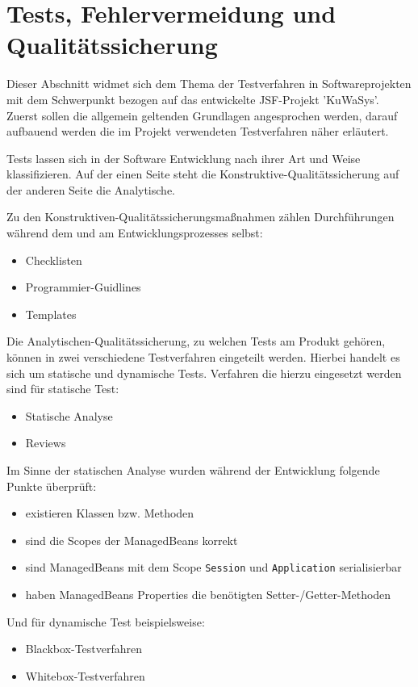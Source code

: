 \documentclass[12pt, twoside, a4paper, ngerman]{article}
\begin{document}
\section{Tests, Fehlervermeidung und Qualitätssicherung}\label{sec:Testing und Debugging}

Dieser Abschnitt widmet sich dem Thema der Testverfahren in Softwareprojekten mit dem Schwerpunkt bezogen auf das entwickelte JSF-Projekt 'KuWaSys'.
Zuerst sollen die allgemein geltenden Grundlagen angesprochen werden, darauf aufbauend werden die im Projekt verwendeten Testverfahren näher erläutert. 

Tests lassen sich in der Software Entwicklung nach ihrer Art und Weise klassifizieren.
Auf der einen Seite steht die Konstruktive-Qualitätssicherung auf der anderen Seite die Analytische.

Zu den Konstruktiven-Qualitätssicherungsmaßnahmen zählen Durchführungen während dem und am Entwicklungsprozesses selbst:
\begin{itemize}
  \item Checklisten
  \item Programmier-Guidlines
  \item Templates
\end{itemize}

Die Analytischen-Qualitätssicherung, zu welchen Tests am Produkt gehören, können in zwei verschiedene Testverfahren eingeteilt werden. Hierbei handelt es sich um statische und dynamische Tests.
Verfahren die hierzu eingesetzt werden sind für statische Test:
\begin{itemize}
  \item Statische Analyse
  \item Reviews
\end{itemize}

Im Sinne der statischen Analyse wurden während der Entwicklung folgende Punkte überprüft:
\begin{itemize}
  \item existieren Klassen bzw. Methoden
  \item sind die Scopes der ManagedBeans korrekt
  \item sind ManagedBeans mit dem Scope \texttt{Session} und \texttt{Application} serialisierbar
  \item haben ManagedBeans Properties die benötigten Setter-/Getter-Methoden
\end{itemize}

Und für dynamische Test beispielsweise:
\begin{itemize}
  \item \gls{Blackbox}-Testverfahren
  \item \gls{Whitebox}-Testverfahren
\end{itemize}
\end{document}
